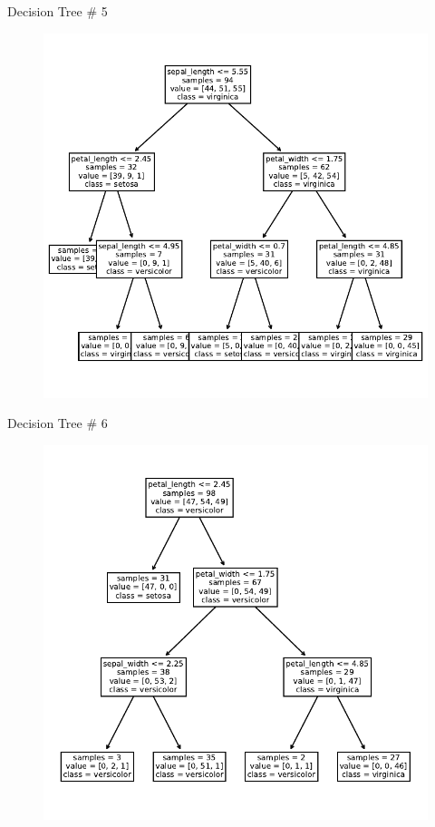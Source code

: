\documentclass{beamer}
\begin{document}
\begin{frame}{Decision Tree \# 5}
\begin{figure}
\includegraphics[scale=0.7]{tree-5.pdf}
\end{figure}
\end{frame}


\begin{frame}{Decision Tree \# 6}
\begin{figure}
\includegraphics[scale=0.7]{tree-6.pdf}
\end{figure}
\end{frame}
\end{document}
